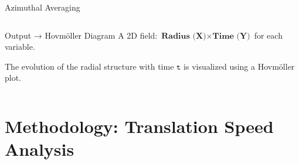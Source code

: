 \documentclass[aspectratio=169,t,xcolor=table]{beamer}
\begin{document}
\begin{frame}{Azimuthal Averaging}
\begin{columns}
		\vspace{0.5cm}

		\begin{alertblock}{\small Output → Hovm\"oller Diagram}
			\scriptsize
			A 2D field: \(\textbf{Radius (X)} \times \textbf{Time (Y)} \) for each variable.

			The evolution of the radial structure with time \(\texttt{t}\) is visualized using a Hovm\"oller plot.
		\end{alertblock}
	\end{columns}
\end{frame}

\section{Methodology: Translation Speed Analysis}
\end{document}
